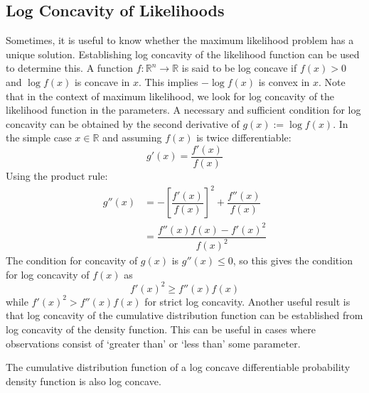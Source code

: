 \documentclass[11pt]{report} %
\begin{document}
\subsection{Log Concavity of Likelihoods}

Sometimes, it is useful to know whether the maximum likelihood problem has a unique solution. Establishing log concavity of the likelihood function can be used to determine this. A function $f: \mathbb{R}^{n}\to\mathbb{R}$ is said to be log concave if $f\left(x\right) > 0$ and $\log f\left(x\right)$ is concave in $x$. This implies $-\log f\left(x\right)$ is convex in $x$. Note that in the context of maximum likelihood, we look for log concavity of the likelihood function in the parameters. A necessary and sufficient condition for log concavity can be obtained by the second derivative of $g\left(x\right) := \log f\left(x\right)$. In the simple case $x\in\mathbb{R}$ and assuming $f\left(x\right)$ is twice differentiable:
\begin{equation}
g'\left(x\right) = \dfrac{f'\left(x\right)}{f\left(x\right)}
\end{equation}
Using the product rule:
\begin{align}
g''\left(x\right) &= -\left[\dfrac{f'\left(x\right)}{f\left(x\right)}\right]^{2} + \dfrac{f''\left(x\right)}{f\left(x\right)} \\
&= \dfrac{f''\left(x\right)f\left(x\right) - f'\left(x\right)^{2}}{f\left(x\right)^{2}}
\end{align}
The condition for concavity of $g\left(x\right)$ is $g''\left(x\right) \leq 0$, so this gives the condition for log concavity of $f\left(x\right)$ as
\begin{equation}
f'\left(x\right)^{2} \geq f''\left(x\right)f\left(x\right)
\end{equation}
while $f'\left(x\right)^{2} > f''\left(x\right)f\left(x\right)$ for strict log concavity. Another useful result is that log concavity of the cumulative distribution function can be established from log concavity of the density function. This can be useful in cases where observations consist of `greater than' or `less than' some parameter.
\begin{theorem}
The cumulative distribution function of a log concave differentiable probability density function is also log concave.
\end{theorem}
\end{document}
